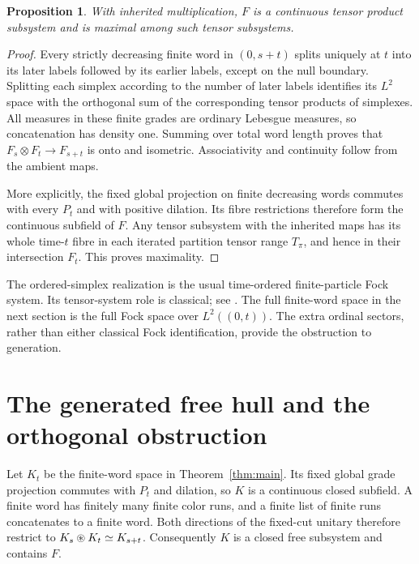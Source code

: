 \documentclass[11pt]{article}
\newtheorem{proposition}[theorem]{Proposition}
\theoremstyle{remark}\newtheorem{remark}[theorem]{Remark}
\begin{document}
\begin{proposition}\label{prop:tensor}
With inherited multiplication, $F$ is a continuous tensor product subsystem
and is maximal among such tensor subsystems.
\end{proposition}

\begin{proof}
Every strictly decreasing finite word in $(0,s+t)$ splits uniquely at $t$
into its later labels followed by its earlier labels, except on the null
boundary. Splitting each simplex according to the number of later labels
identifies its $L^2$ space with the orthogonal sum of the corresponding tensor
products of simplexes. All measures in these finite grades are ordinary
Lebesgue measures, so concatenation has density one. Summing over total word
length proves that $F_s\otimes F_t\to F_{s+t}$ is onto and isometric.
Associativity and continuity follow from the ambient maps.

More explicitly, the fixed global projection on finite decreasing words
commutes with every $P_t$ and with positive dilation. Its fibre restrictions
therefore form the continuous subfield of $F$. Any tensor subsystem with the
inherited maps has its whole time-$t$ fibre in each iterated partition tensor
range $T_\pi$, and hence in their intersection $F_t$. This proves maximality.
\end{proof}

The ordered-simplex realization is the usual time-ordered finite-particle Fock
system. Its tensor-system role is classical; see \cite{Arveson2003,Skeide2006}.
The full finite-word space in the next section is the full Fock space over
$L^2((0,t))$. The extra ordinal sectors, rather than either classical Fock
identification, provide the obstruction to generation.

\section{The generated free hull and the orthogonal obstruction}\label{sec:hull}

Let $K_t$ be the finite-word space in Theorem~\ref{thm:main}. Its fixed global
grade projection commutes with $P_t$ and dilation, so $K$ is a continuous
closed subfield. A finite word has finitely many finite color runs, and a finite
list of finite runs concatenates to a finite word. Both directions of the
fixed-cut unitary therefore restrict to $K_s\mathbin{\circledast} K_t\simeq K_{s+t}$.
Consequently $K$ is a closed free subsystem and contains $F$.
\end{document}
